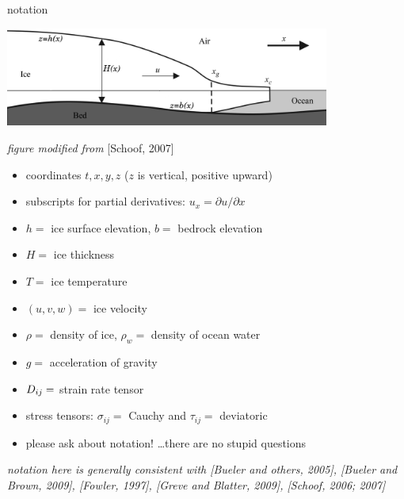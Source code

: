 
\begin{frame}{notation} 

\begin{center}
  \includegraphics[width=0.8\textwidth]{photos/flowline}

\vspace{-0.1in}
\tiny \emph{figure modified from} [Schoof, 2007]\nocite{SchoofMarine1} \normalsize
\end{center}

\scriptsize
  \begin{itemize}
  \item coordinates $t,x,y,z$ \hfill  ($z$ is vertical, positive upward)
  \item subscripts for partial derivatives: $u_x = \partial u/\partial x$
  \item $h=$ ice surface elevation, \quad $b=$ bedrock elevation
  \item $H=$ ice thickness
  \item $T=$ ice temperature
  \item $(u,v,w)=$ ice velocity
  \item $\rho=$ density of ice, \quad $\rho_w=$ density of ocean water
  \item $g=$ acceleration of gravity
  \item $D_{ij}=$ strain rate tensor
  \item stress tensors: $\sigma_{ij}=$ Cauchy and $\tau_{ij}=$ deviatoric
  \item \alert{please ask about notation!} \qquad \scriptsize \dots there are no stupid questions \small
  \end{itemize}

\emph{notation here is generally consistent with  [Bueler and others, 2005]\nocite{BLKCB}, [Bueler and Brown, 2009]\nocite{BBssasliding}, [Fowler, 1997]\nocite{Fowler}, [Greve and Blatter, 2009]\nocite{GreveBlatter2009}, [Schoof, 2006; 2007]\nocite{SchoofStream,SchoofMarine1}}
\end{frame}



